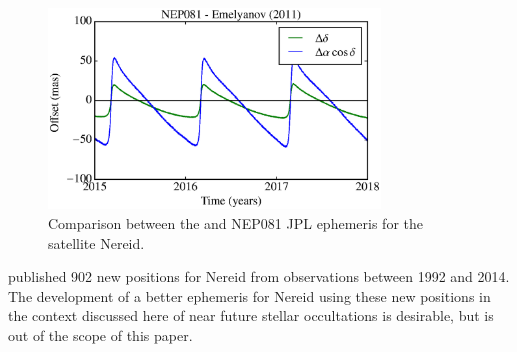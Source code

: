 \begin{figure}
\begin{centering}
\includegraphics[width=8.8cm]{figures/JPL-EME_Nereid.eps}
\caption{Comparison between the \cite{Emelyanov2011} and NEP081 JPL \citep{Jacobson2009} ephemeris for the satellite Nereid.}
\label{Fig:eph-Nereid}
\end{centering}
\end{figure}

\cite{GomesJunior2015} published 902 new positions for Nereid from observations between 1992 and 2014. The development of a better ephemeris for Nereid using these new positions in the context discussed here of near future stellar occultations is desirable, but is out of the scope of this paper.  






